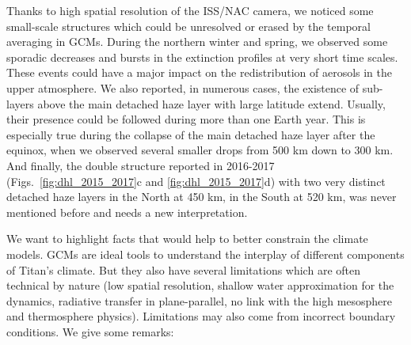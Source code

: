 Thanks to high spatial resolution of the ISS/NAC camera, we noticed some small-scale structures which could be unresolved or
erased by the temporal averaging in GCMs. During the northern winter and spring, we observed some sporadic decreases and
bursts in the extinction profiles at very short time scales. These events could have a major impact on the redistribution of
aerosols in the upper atmosphere. We also reported, in numerous cases, the existence of sub-layers above the main detached
haze layer with large latitude extend. Usually, their presence could be followed during more than one Earth year. This is
especially true during the collapse of the main detached haze layer after the equinox, when we observed several smaller
drops from 500 km down to 300 km. And finally, the double structure reported in 2016-2017
(Figs.~\ref{fig:dhl_2015_2017}c and \ref{fig:dhl_2015_2017}d) with two very distinct detached haze layers in the
North at 450 km, in the South at 520 km, was never mentioned before and needs a new interpretation.

We want to highlight facts that would help to better constrain the climate models.
GCMs are ideal tools to understand the interplay of different components of Titan's climate.
But they also have several limitations which are often technical by nature (low spatial resolution, shallow water
approximation for the dynamics, radiative transfer in plane-parallel, no link with the high mesosphere and thermosphere physics).
Limitations may also come from incorrect boundary conditions. We give some remarks:

